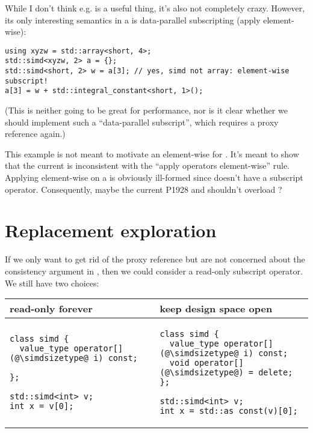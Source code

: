 While I don't think e.g.  is a useful thing,
it's also not completely crazy.
However, its only interesting semantics in a \simd is data-parallel
subscripting (apply  element-wise):
\medskip\begin{lstlisting}[style=Vc]
using xyzw = std::array<short, 4>;
std::simd<xyzw, 2> a = {};
std::simd<short, 2> w = a[3]; // yes, simd not array: element-wise subscript!
a[3] = w + std::integral_constant<short, 1>();
\end{lstlisting}

(This is neither going to be great for performance, nor is it clear whether we
should implement such a “data-parallel subscript”, which requires a proxy
reference again.)

This example is not meant to motivate an element-wise  for .
It's meant to show that the current  is inconsistent
with the “apply operators element-wise” rule.
Applying  element-wise on a  is obviously
ill-formed since  doesn't have a subscript operator.
Consequently, maybe the current P1928 \simd and \mask shouldn't overload
?



\section{Replacement exploration}

If we only want to get rid of the proxy reference but are not concerned about
the consistency argument in , then we could consider a
read-only subscript operator.
We still have two choices:\\
\begingroup
  \smaller[1]
\begin{tabular}{p{}|p{}}
  read-only forever & keep design space open \\
  \hline
  \begin{lstlisting}
class simd {
  value_type operator[](@\simdsizetype@ i) const;

};
  \end{lstlisting}

  \medskip
  \begin{lstlisting}
std::simd<int> v;
int x = v[0];
  \end{lstlisting}
  &
  \begin{lstlisting}
class simd {
  value_type operator[](@\simdsizetype@ i) const;
  void operator[](@\simdsizetype@) = delete;
};
  \end{lstlisting}

  \medskip
  \begin{lstlisting}
std::simd<int> v;
int x = std::as_const(v)[0];
  \end{lstlisting}
\end{tabular}
\endgroup

